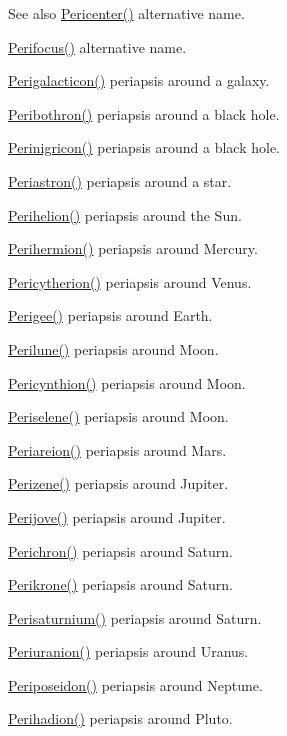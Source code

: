 \begin{DoxySeeAlso}{See also}
\hyperlink{group___periapsis_gac4c419a87a5802cf6afc98f50792e99f}{Pericenter()} alternative name. 

\hyperlink{group___periapsis_gaff62669fb364a245cb85f9a91d8ea71f}{Perifocus()} alternative name. 

\hyperlink{group___periapsis_ga074fecab96b90bebffa512a37e52d90b}{Perigalacticon()} periapsis around a galaxy. 

\hyperlink{group___periapsis_gada5892309279a3a687c4eb2f88238e4e}{Peribothron()} periapsis around a black hole. 

\hyperlink{group___periapsis_ga99d86af90179994e17158b082c502fd4}{Perinigricon()} periapsis around a black hole. 

\hyperlink{group___periapsis_ga477de6824cbb5986cdae923141e21648}{Periastron()} periapsis around a star. 

\hyperlink{group___periapsis_ga941d285e3a0b48ada9c9f60925ff63c2}{Perihelion()} periapsis around the Sun. 

\hyperlink{group___periapsis_ga9562e9cbfd73019ae9cdaa643b843d63}{Perihermion()} periapsis around Mercury. 

\hyperlink{group___periapsis_gaa270e364cbbd7d3d6212872df484926f}{Pericytherion()} periapsis around Venus. 

\hyperlink{group___periapsis_gae2d053caf69cb0b4c3207064a2ab143a}{Perigee()} periapsis around Earth. 

\hyperlink{group___periapsis_ga2cc7ab05e18d32c94d8d74972e032793}{Perilune()} periapsis around Moon. 

\hyperlink{group___periapsis_gaeeba153b188cd06cbd233eaef12f0a6a}{Pericynthion()} periapsis around Moon. 

\hyperlink{group___periapsis_ga255874374dde571531e443cdbef9ef0c}{Periselene()} periapsis around Moon. 

\hyperlink{group___periapsis_ga0617ba07a30b0fd0544c02f691bfae26}{Periareion()} periapsis around Mars. 

\hyperlink{group___periapsis_ga0523c65b7fc26e675388b2c3d38aa00b}{Perizene()} periapsis around Jupiter. 

\hyperlink{group___periapsis_ga075052f7ff9aa1d5fdf4501b493be86b}{Perijove()} periapsis around Jupiter. 

\hyperlink{group___periapsis_ga12b5e99aa2e3e7031ef6ce93060cf516}{Perichron()} periapsis around Saturn. 

\hyperlink{group___periapsis_gaa56f74c44a3583b8f0d13b821c1d7422}{Perikrone()} periapsis around Saturn. 

\hyperlink{group___periapsis_ga60a50d09d29ebe47cbbfc125c2ea42bf}{Perisaturnium()} periapsis around Saturn. 

\hyperlink{group___periapsis_gab8b8131a617dd2d2a4de1d48accd7442}{Periuranion()} periapsis around Uranus. 

\hyperlink{group___periapsis_ga237e7af3794202c67e65f64f4c8abc2a}{Periposeidon()} periapsis around Neptune. 

\hyperlink{group___periapsis_gafb16e46e55078b38604eef0d7c7c40c4}{Perihadion()} periapsis around Pluto. 
\end{DoxySeeAlso}
